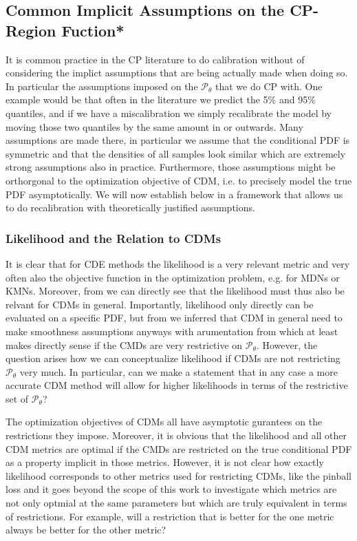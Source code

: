 \subsection{Common Implicit Assumptions on the CP-Region Fuction*}\label{sec:implicit_assumptions_cp}

It is common practice in the CP literature to do calibration without of considering the implict assumptions that are being actually made when doing so. In particular the assumptions imposed on the $\mathscr{P}_\theta$ that we do CP with. One example would be that often in the literature we predict the 5\% and 95\% quantiles, and if we have a miscalibration we simply recalibrate the model by moving those two quantiles by the same amount in or outwards. Many assumptions are made there, in particular we assume that the conditional PDF is symmetric and that the densities of all samples look similar which are extremely strong assumptions also in practice. Furthermore, those assumptions might be orthorgonal to the optimization objective of CDM, i.e. to precisely model the true PDF asymptotically. We will now establish below in  a framework that allows us to do recalibration with theoretically justified assumptions.

\subsubsection{Likelihood and the Relation to CDMs}\label{sec:shape_importance}

It is clear that for CDE methods the likelihood is a very relevant metric and very often also the objective function in the optimization problem, e.g. for MDNs or KMNs. Moreover, from  we can directly see that the likelihood must thus also be relvant for CDMs in general. Importantly, likelihood only directly can be evaluated on a specific PDF, but from  we inferred that CDM in general need to make smoothness assumptions anyways with arumentation from  which at least makes directly sense if the CMDs are very restrictive on $\mathscr{P}_\theta$. However, the question arises how we can conceptualize likelihood if CDMs are not restricting $\mathscr{P}_\theta$ very much. In particular, can we make a statement that in any case a more accurate CDM method will allow for higher likelihoods in terms of the restrictive set of $\mathscr{P}_\theta$?

The optimization objectives of CDMs all have asymptotic gurantees on the restrictions they impose. Moreover, it is obvious that the likelihood and all other CDM metrics are optimal if the CMDs are restricted on the true conditional PDF as a property implicit in those metrics. However, it is not clear how exactly likelihood corresponds to other metrics used for restricting CDMs, like the pinball loss and it goes beyond the scope of this work to investigate which metrics are not only optmial at the same parameters but which are truly equivalent in terms of restrictions. For example, will a restriction that is better for the one metric always be better for the other metric? 

